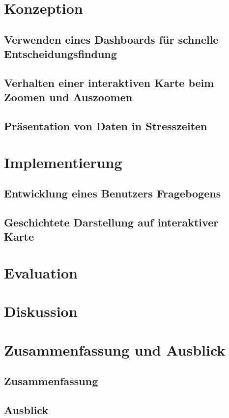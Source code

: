 




\chapter{Konzeption} \label{chap:konzeption}
\section{Verwenden eines Dashboards für schnelle Entscheidungsfindung}
\section{Verhalten einer interaktiven Karte beim Zoomen und Auszoomen}
\section{Präsentation von Daten in Stresszeiten}

\chapter{Implementierung}
\section{Entwicklung eines Benutzers Fragebogens}
\section{Geschichtete Darstellung auf interaktiver Karte}

\chapter{Evaluation}

\chapter{Diskussion}

\chapter{Zusammenfassung und Ausblick}
\section{Zusammenfassung}
\section{Ausblick}
